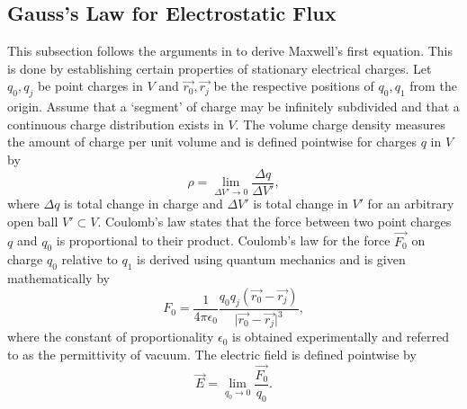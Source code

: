 \documentclass[12pt]{article}
\theoremstyle{definition}
\numberwithin{equation}{section}
\begin{document}
\subsection{Gauss's Law for Electrostatic Flux}
\label{gausseleclaw}
This subsection follows the arguments in \cite{Reitz} to derive Maxwell's first equation. This is done by establishing certain properties of stationary electrical charges. Let $q_0,q_j$ be point charges in $V$ and $\vec{r_0},\vec{r_j}$ be the respective positions of $q_0,q_1$ from the origin. Assume that a `segment' of charge may be infinitely subdivided and that a continuous charge distribution exists in $V$. The volume charge density measures the amount of charge per unit volume and is defined pointwise for charges $q$ in $V$ by
\begin{equation}
\rho=\lim_{\Delta V'\rightarrow 0}\frac{\Delta q}{\Delta V'},
\label{charge_density.eqn}
\end{equation}
where $\Delta q$ is total change in charge and $\Delta V'$ is total change in $V'$ for an arbitrary open ball $V'\subset V$. Coulomb's law states that the force between two point charges $q$ and $q_0$ is proportional to their product. Coulomb's law for the force $\vec{F_0}$ on charge $q_0$ relative to $q_1$ is derived using quantum mechanics and is given mathematically by
\begin{equation}
{F_0}=\frac{1}{4\pi\epsilon_0}\frac{q_0 q_j(\vec{r_0}-\vec{r_j})}{\vert\vec{r_0}-\vec{r_j}\vert^3},
\label{F_e.eqn}
\end{equation}
where the constant of proportionality $\epsilon_0$ is obtained experimentally and referred to as the permittivity of vacuum. The electric field is defined pointwise by
$$\vec{E}=\lim_{q_0\rightarrow 0}\frac{\vec{F_0}}{q_0}.$$
\end{document}

